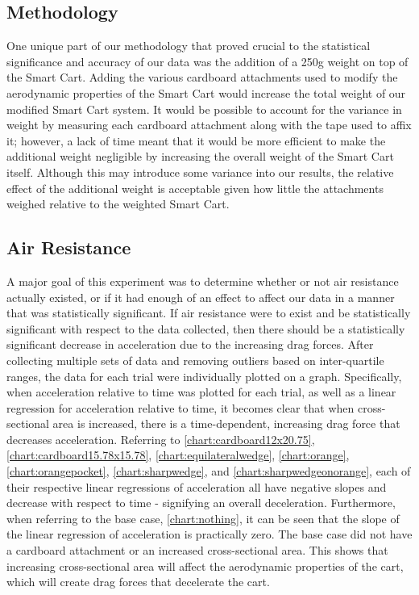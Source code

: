 \subsection{Methodology}
One unique part of our methodology that proved crucial to the statistical
significance and accuracy of our data was the addition of a 250g weight on top of the
Smart Cart. Adding the various cardboard attachments used to modify the aerodynamic properties of the
Smart Cart would increase the total weight of our modified Smart Cart system. It would be possible to
account for the variance in weight by measuring each cardboard attachment along with the tape used to
affix it; however, a lack of time meant that it would be more efficient to make the additional weight
negligible by increasing the overall weight of the Smart Cart itself. Although this may introduce some
variance into our results, the relative effect of the additional weight is acceptable given how little
the attachments weighed relative to the weighted Smart Cart.

\subsection{Air Resistance}
A major goal of this experiment was to determine whether or not air resistance actually existed, or if 
it had enough of an effect to affect our data in a manner that was statistically significant. If air resistance
were to exist and be statistically significant with respect to the data collected, then there should be a statistically significant
decrease in acceleration due to the increasing drag forces. After collecting multiple sets of
data and removing outliers based on inter-quartile ranges, the data for each trial were individually plotted on a graph.
Specifically, when acceleration relative to time was plotted for each trial, as well as a linear regression for acceleration relative to time,
it becomes clear that when cross-sectional area is increased, there is a time-dependent, increasing drag force that decreases acceleration.
Referring to \ref{chart:cardboard12x20.75}, \ref{chart:cardboard15.78x15.78}, \ref{chart:equilateralwedge}, \ref{chart:orange}, \ref{chart:orangepocket}, \ref{chart:sharpwedge}, and \ref{chart:sharpwedgeonorange},
each of their respective linear regressions of acceleration all have negative slopes and decrease with respect to time - signifying an overall deceleration.
Furthermore, when referring to the base case, \ref{chart:nothing}, it can be seen that the slope of the linear regression of acceleration is
practically zero. The base case did not have a cardboard attachment or an increased cross-sectional area.
This shows that increasing cross-sectional area will affect the aerodynamic properties of the cart,
which will create drag forces that decelerate the cart.

